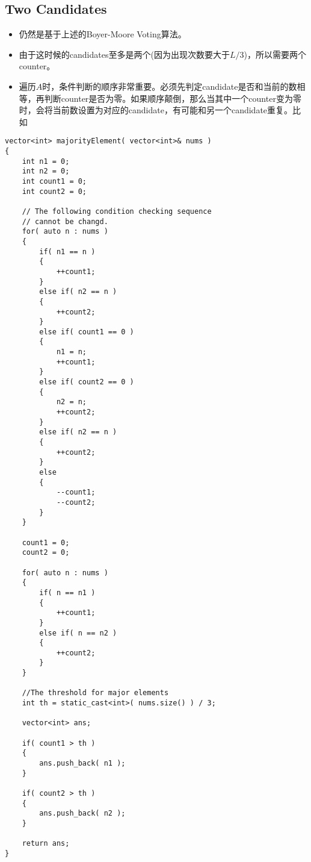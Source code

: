 \subsection{Two Candidates}

\begin{itemize}
\item 仍然是基于上述的Boyer-Moore Voting算法。
\item 由于这时候的candidates至多是两个(因为出现次数要大于$L/3$)，所以需要两个counter。
\item 遍历$A$时，条件判断的顺序非常重要。必须先判定candidate是否和当前的数相等，再判断counter是否为零。如果顺序颠倒，那么当其中一个counter变为零时，会将当前数设置为对应的candidate，有可能和另一个candidate重复。比如\fcj{[1, 2, 2, 3, 2, 1, 1, 3]}
\end{itemize}

\setcounter{lstlisting}{0}
\begin{lstlisting}[style=customc, caption={Two Candidates Voting Algorithm}]
vector<int> majorityElement( vector<int>& nums )
{
    int n1 = 0;
    int n2 = 0;
    int count1 = 0;
    int count2 = 0;

    // The following condition checking sequence
    // cannot be changd.
    for( auto n : nums )
    {
        if( n1 == n )
        {
            ++count1;
        }
        else if( n2 == n )
        {
            ++count2;
        }
        else if( count1 == 0 )
        {
            n1 = n;
            ++count1;
        }
        else if( count2 == 0 )
        {
            n2 = n;
            ++count2;
        }
        else if( n2 == n )
        {
            ++count2;
        }
        else
        {
            --count1;
            --count2;
        }
    }

    count1 = 0;
    count2 = 0;

    for( auto n : nums )
    {
        if( n == n1 )
        {
            ++count1;
        }
        else if( n == n2 )
        {
            ++count2;
        }
    }

    //The threshold for major elements
    int th = static_cast<int>( nums.size() ) / 3;

    vector<int> ans;

    if( count1 > th )
    {
        ans.push_back( n1 );
    }

    if( count2 > th )
    {
        ans.push_back( n2 );
    }

    return ans;
}
\end{lstlisting}